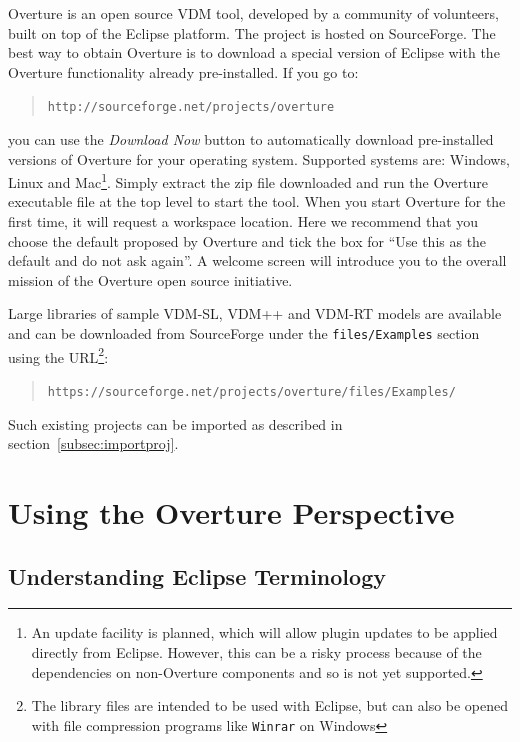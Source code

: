 \documentclass{overturerepchap}
\newcommand{\url}[1]{\texttt{#1}}
\begin{document}
Overture is an open source VDM tool, developed by a community of volunteers,
built on top of the Eclipse platform. The project 
is hosted on SourceForge.  The best way to obtain Overture is to download 
a special version of Eclipse with the Overture functionality already pre-installed. If you go to:
  \begin{quote}
  \url{http://sourceforge.net/projects/overture}
  \end{quote}
  \noindent you can use the \textit{Download Now} button to
  automatically download pre-installed versions of Overture for your
  operating system.  Supported systems are: Windows, Linux and
  Mac\footnote{An update facility is planned, which will allow plugin
    updates to be applied directly from Eclipse.
    However, this can be
    a risky process because of the dependencies on non-Overture
    components and so is not yet supported.}.
Simply extract the zip file downloaded and run the Overture executable
file at the top level to start the tool.
When you start Overture for the first time, it will request a workspace
location. Here we recommend that you  choose the default proposed 
by Overture and tick the box for ``Use this as the default and do
not ask again''. A welcome screen will introduce you to the overall 
mission of the Overture open source initiative. 

Large libraries of sample VDM-SL, VDM++ and VDM-RT models are available
and can be downloaded from SourceForge under the
\texttt{files/Examples} section using the URL\footnote{The library
  files are intended to be used with Eclipse, but can also be opened with
  file compression programs like \texttt{Winrar} on Windows}:
\begin{quote}
\url{https://sourceforge.net/projects/overture/files/Examples/}
\end{quote}
Such existing projects can be imported as described in
section~\ref{subsec:importproj}. 

\chapter{Using the Overture Perspective}\label{sec:vdmsupport}

\section{Understanding Eclipse Terminology}
\end{document}
